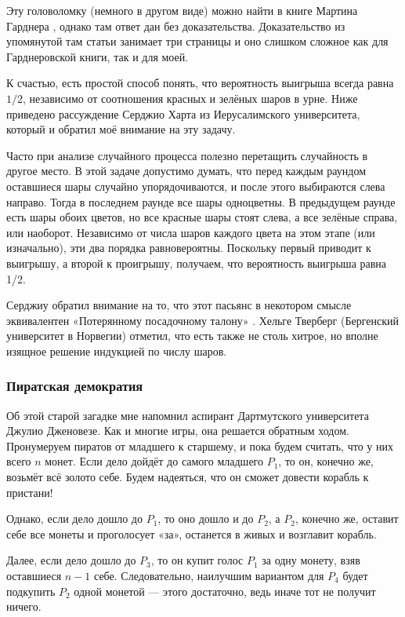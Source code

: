 Эту головоломку (немного в другом виде) можно найти в книге Мартина Гарднера \cite[2.16]{30}, однако там ответ дан без доказательства.
Доказательство из упомянутой там статьи \cite{45} занимает три страницы и оно слишком сложное как для Гарднеровской книги, так и для моей.

К счастью, есть простой способ понять, что вероятность выигрыша всегда равна $1/2$, независимо от соотношения красных и зелёных шаров в урне.
Ниже приведено рассуждение Серджио Харта из Иерусалимского университета, который и обратил моё внимание на эту задачу.

Часто при анализе случайного процесса полезно перетащить случайность в другое место.
В этой задаче допустимо думать, что перед каждым раундом оставшиеся шары случайно упорядочиваются, и после этого выбираются слева направо.
Тогда в последнем раунде все шары одноцветны.
В предыдущем раунде есть шары обоих цветов, но все красные шары стоят слева, а все зелёные справа, или наоборот.
Независимо от числа шаров каждого цвета на этом этапе (или изначально), эти два порядка равновероятны.
Поскольку первый приводит к выигрышу, а второй к проигрышу, получаем, что вероятность выигрыша равна 1/2.

Серджиу обратил внимание на то, что этот пасьянс в некотором смысле эквивалентен «Потерянному посадочному талону» \cite[стр. 42]{59}.
Хельге Тверберг (Бергенский университет в Норвегии) отметил, что есть также не столь хитрое, но вполне изящное решение индукцией по числу шаров.

\subsubsection*{Пиратская демократия}

Об этой старой загадке мне напомнил аспирант Дартмутского университета Джулио Дженовезе.
Как и многие игры, она решается обратным ходом.
Пронумеруем пиратов от младшего к старшему, и пока будем считать, что у них всего $n$ монет.
Если дело дойдёт до самого младшего $P_1$, то он, конечно же, возьмёт всё золото себе. Будем надеяться, что он сможет довести корабль к пристани!

Однако, если дело дошло до $P_1$, то оно дошло и до $P_2$, а
$P_2$, конечно же, оставит себе все монеты и проголосует «за», останется в живых и возглавит корабль.

Далее, если дело дошло до $P_3$, то он купит голос $P_1$ за одну монету, взяв оставшиеся $n - 1$ себе.
Следовательно, наилучшим вариантом для $P_4$ будет подкупить $P_2$ одной монетой --- этого достаточно, ведь иначе тот не получит ничего.

